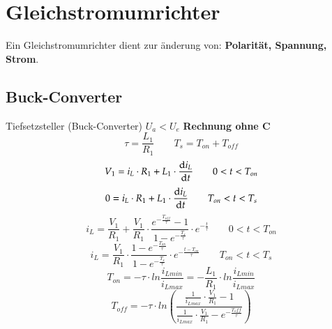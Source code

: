 \section{Gleichstromumrichter}
Ein Gleichstromumrichter dient zur änderung von: \textbf{Polarität, Spannung, Strom}.\newline
\subsection{Buck-Converter}
\begin{minipage}{0.75\linewidth}
    Tiefsetzsteller (Buck-Converter) $U_a < U_e  $\newline
    \textbf{Rechnung ohne C}\newline
    \[ \tau=\frac{L_1}{R_1} \qquad T_s=T_{on} + T_{off} \]
    \[ V_1 = i_L\cdot R_1+L_1\cdot\frac{\mathop{}\!\mathrm{d} i_L}{\mathop{}\!\mathrm{d} t} \qquad 0<t<T_{on} \]
    \[ 0 = i_L\cdot R_1+L_1\cdot\frac{\mathop{}\!\mathrm{d} i_L}{\mathop{}\!\mathrm{d} t} \qquad T_{on}<t<T_{s} \]    
    \[ i_L=\frac{V_1}{R_1}+ \frac{V_1}{R_1}\cdot \frac{e^{-\frac{T_{off}}{\tau}}-1}{1-e^{-\frac{T_{s}}{\tau}}}\cdot e^{-\frac{t}{\tau}} \qquad 0<t<T_{on}  \]
    \[ i_L=\frac{V_1}{R_1}\cdot \frac{1-e^{-\frac{T_{on}}{\tau}}}{1-e^{-\frac{T_{s}}{\tau}}}\cdot e^{-\frac{t-T_{on}}{\tau}} \qquad T_{on}<t<T_{s}  \]    
    \[ T_{on}=-\tau \cdot ln\frac{i_{Lmin}}{i_{Lmax}}= -\frac{L_1}{R_1}\cdot ln\frac{i_{Lmin}}{i_{Lmax}} \]    
    \[ T_{off}=-\tau \cdot ln\left(\frac{\frac{1}{i_{Lmax}}\cdot\frac{V_1}{R_1}-1}{\frac{1}{i_{Lmax}}\cdot \frac{V_1}{R_1}-e^{-\frac{T_off}{\tau}}}\right) \]
\end{minipage}
